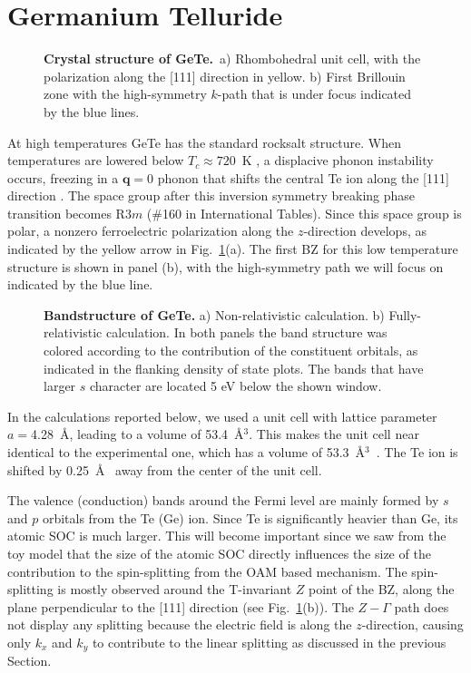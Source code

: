 \section{Germanium Telluride}
\begin{figure}[h]
\caption{\label{fig:Rashba_crystal}{\bf Crystal structure of GeTe.}~a) Rhombohedral unit cell, with the polarization along the [111] direction in yellow. b) First Brillouin zone with the high-symmetry $k$-path that is under focus indicated by the blue lines.}
\end{figure}
At high temperatures GeTe has the standard rocksalt structure.
When temperatures are lowered below $T_c \approx 720$~K \cite{DiSante2013}, a displacive phonon instability occurs, freezing in a $\bm{q} = 0$ phonon that shifts the central Te ion along the [111] direction \cite{Rabe1987}.
The space group after this inversion symmetry breaking phase transition becomes R$3m$ (\#160 in International Tables).
Since this space group is polar, a nonzero ferroelectric polarization along the $z$-direction develops, as indicated by the yellow arrow in Fig.~\ref{fig:Rashba_crystal}(a).
The first BZ for this low temperature structure is shown in panel (b), with the high-symmetry path we will focus on indicated by the blue line.

\begin{figure}[h!]
\caption{\label{fig:Rashba_bands_dos}{\bf Bandstructure of GeTe.} a) Non-relativistic calculation. b) Fully-relativistic calculation. In both panels the band structure was colored according to the contribution of the constituent orbitals, as indicated in the flanking density of state plots. The bands that have larger $s$ character are located 5 eV below the shown window.}
\end{figure}
In the calculations reported below, we used a unit cell with lattice parameter $a=$4.28~\AA, leading to a volume of 53.4~\AA$^3$.
This makes the unit cell near identical to the experimental one, which has a volume of 53.3~\AA$^3$~\cite{Serebryanaya1995}.
The Te ion is shifted by 0.25~\AA~ away from the center of the unit cell.

The valence (conduction) bands around the Fermi level are mainly formed by $s$ and $p$ orbitals from the Te (Ge) ion.
Since Te is significantly heavier than Ge, its atomic SOC is much larger. This will become important since we saw from the toy model that the size of the atomic SOC directly influences the size of the contribution to the spin-splitting from the OAM based mechanism.
The spin-splitting is mostly observed around the T-invariant $Z$ point of the BZ, along the plane perpendicular to the [111] direction (see Fig.~\ref{fig:Rashba_crystal}(b)).
The $Z-\Gamma$ path does not display any splitting because the electric field is along the $z$-direction, causing only  $k_x$ and $k_y$ to contribute to the linear splitting as discussed in the previous Section.

